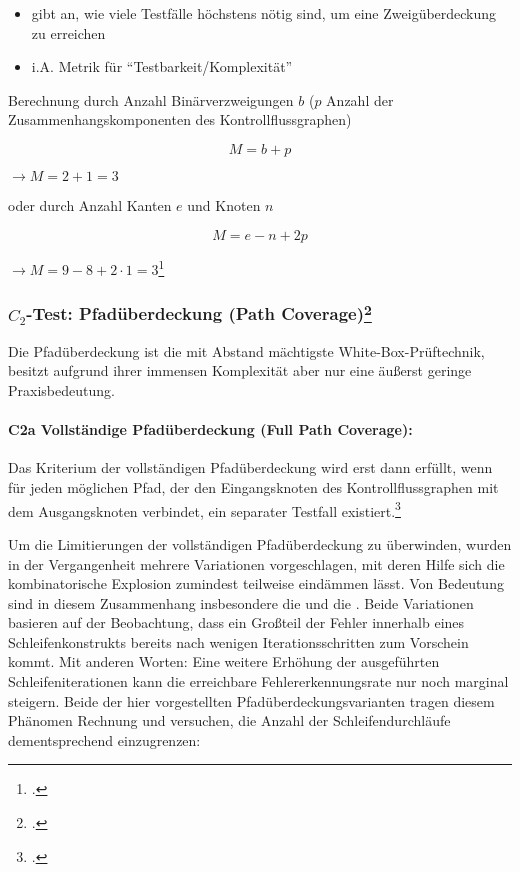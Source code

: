 \documentclass{lehramt-informatik-haupt}
\begin{document}
\begin{itemize}
\item gibt an, wie viele Testfälle höchstens nötig sind, um eine
Zweigüberdeckung zu erreichen

\item i.A. Metrik für “Testbarkeit/Komplexität”
\end{itemize}

\noindent
Berechnung durch Anzahl Binärverzweigungen $b$ ($p$ Anzahl der
Zusammenhangskomponenten des Kontrollflussgraphen)

\begin{displaymath}
M = b + p
\end{displaymath}

$\rightarrow M = 2 + 1 = 3$

\noindent
oder durch Anzahl Kanten $e$ und Knoten $n$

\begin{displaymath}
M = e - n + 2p
\end{displaymath}

$\rightarrow M = 9 - 8 + 2 \cdot 1 = 3$\footcite[Kapitel 4.4.6
McCabe-Überdeckung, Seite 216-220]{hoffmann:software}

%

\subsubsection{$C_2$-Test: Pfadüberdeckung (Path Coverage)\footcite[Seite 39]{sosy:fs:5}}

Die Pfadüberdeckung ist die mit Abstand mächtigste
White-Box-Prüftechnik, besitzt aufgrund ihrer immensen Komplexität
aber nur eine äußerst geringe Praxisbedeutung.

%

\paragraph{C2a Vollständige Pfadüberdeckung (Full Path Coverage):}

Das Kriterium der vollständigen Pfadüberdeckung wird erst dann erfüllt,
wenn für jeden möglichen Pfad, der den Eingangsknoten des
Kontrollflussgraphen mit dem Ausgangsknoten verbindet, ein separater
Testfall existiert.\footcite[Seite 210]{hoffmann:software}

Um die Limitierungen der vollständigen Pfadüberdeckung zu überwinden,
wurden in der Vergangenheit mehrere Variationen vorgeschlagen, mit deren
Hilfe sich die kombinatorische Explosion zumindest teilweise eindämmen
lässt. Von Bedeutung sind in diesem Zusammenhang insbesondere die
 und die . Beide Variationen basieren auf der Beobachtung, dass
ein Großteil der Fehler innerhalb eines Schleifenkonstrukts bereits nach
wenigen Iterationsschritten zum Vorschein kommt. Mit anderen Worten:
Eine weitere Erhöhung der ausgeführten Schleifeniterationen kann die
erreichbare Fehlererkennungsrate nur noch marginal steigern. Beide der
hier vorgestellten Pfadüberdeckungsvarianten tragen diesem Phänomen
Rechnung und versuchen, die Anzahl der Schleifendurchläufe
dementsprechend einzugrenzen:
\end{document}

